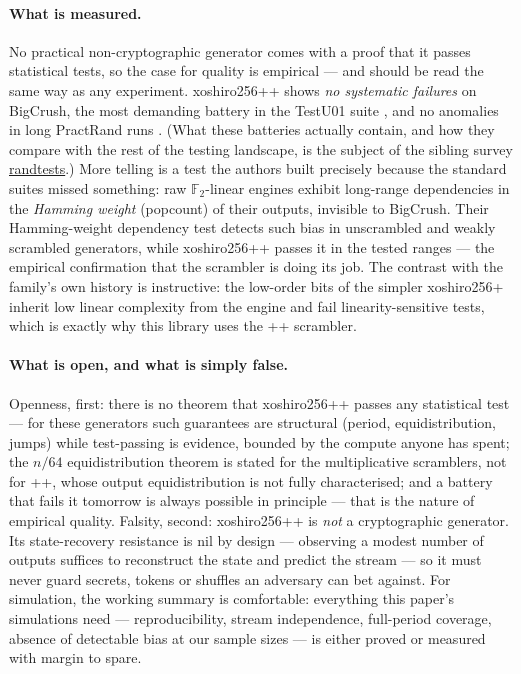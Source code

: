\documentclass[11pt]{article}
\numberwithin{equation}{section}
\newcommand{\sisterurl}{https://sanya-shopper.github.io/randtests/}
\begin{document}
\paragraph{What is measured.}
No practical non-cryptographic generator comes with a proof that it passes
statistical tests, so the case for quality is empirical --- and should be
read the same way as any experiment.  xoshiro256++ shows \emph{no
systematic failures} on BigCrush, the most demanding battery in the
TestU01 suite \citep{lecuyer2007testu01}, and no anomalies in long
PractRand runs \citep{dotyhumphrey_practrand}.  (What these batteries
actually contain, and how they compare with the rest of the testing
landscape, is the subject of the sibling survey
\href{\sisterurl}{randtests}.)  More telling is a test the
authors built precisely because the standard suites missed something: raw
$\mathbb{F}_2$-linear engines exhibit long-range dependencies in the
\emph{Hamming weight} (popcount) of their outputs, invisible to BigCrush.
Their Hamming-weight dependency test detects such bias in unscrambled and
weakly scrambled generators, while xoshiro256++ passes it in the tested
ranges \citep{blackman2021xoshiro} --- the empirical confirmation that the
scrambler is doing its job.  The contrast with the family's own history is
instructive: the low-order bits of the simpler xoshiro256+ inherit low
linear complexity from the engine and fail linearity-sensitive tests,
which is exactly why this library uses the ++ scrambler.

\paragraph{What is open, and what is simply false.}
Openness, first: there is no theorem that xoshiro256++ passes any
statistical test --- for these generators such guarantees are structural
(period, equidistribution, jumps) while test-passing is evidence, bounded
by the compute anyone has spent; the $n/64$ equidistribution theorem is
stated for the multiplicative scramblers, not for ++, whose output
equidistribution is not fully characterised; and a battery that fails it
tomorrow is always possible in principle --- that is the nature of
empirical quality.  Falsity, second: xoshiro256++ is \emph{not} a
cryptographic generator.  Its state-recovery resistance is nil by design
--- observing a modest number of outputs suffices to reconstruct the state
and predict the stream --- so it must never guard secrets, tokens or
shuffles an adversary can bet against.  For simulation, the working
summary is comfortable: everything this paper's simulations need ---
reproducibility, stream independence, full-period coverage, absence of
detectable bias at our sample sizes --- is either proved or measured with
margin to spare.
\end{document}
